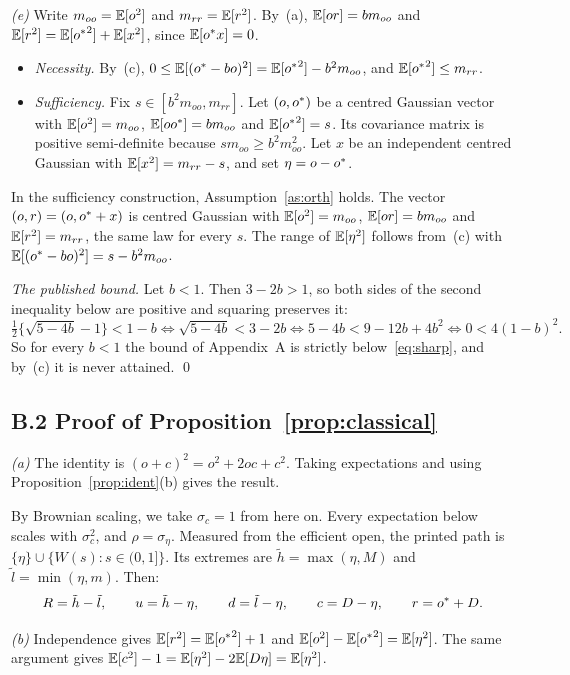 \emph{(e)} Write $m_{oo}=\mathbb{E}[o^2]$ and $m_{rr}=\mathbb{E}[r^2]$. By~(a), $\mathbb{E}[or]=bm_{oo}$ and
$\mathbb{E}[r^2]=\mathbb{E}[{o^{*}}^2]+\mathbb{E}[x^2]$, since $\mathbb{E}[{o^{*}} x]=0$.
\begin{itemize}
  \item \emph{Necessity.} By~(c), $0\le\mathbb{E}[({o^{*}}-bo)^2]=\mathbb{E}[{o^{*}}^2]-b^2m_{oo}$, and
        $\mathbb{E}[{o^{*}}^2]\le m_{rr}$.
  \item \emph{Sufficiency.} Fix $s\in[b^2m_{oo},m_{rr}]$. Let $(o,{o^{*}})$ be a centred Gaussian
        vector with $\mathbb{E}[o^2]=m_{oo}$, $\mathbb{E}[o{o^{*}}]=bm_{oo}$ and $\mathbb{E}[{o^{*}}^2]=s$. Its covariance matrix
        is positive semi-definite because $sm_{oo}\ge b^2m_{oo}^2$. Let $x$ be an independent
        centred Gaussian with $\mathbb{E}[x^2]=m_{rr}-s$, and set $\eta=o-{o^{*}}$.
\end{itemize}
In the sufficiency construction, Assumption~\ref{as:orth} holds. The vector $(o,r)=(o,{o^{*}}+x)$ is
centred Gaussian with $\mathbb{E}[o^2]=m_{oo}$, $\mathbb{E}[or]=bm_{oo}$ and $\mathbb{E}[r^2]=m_{rr}$, the same law for
every $s$. The range of $\mathbb{E}[\eta^2]$ follows from~(c) with
$\mathbb{E}[({o^{*}}-bo)^2]=s-b^2m_{oo}$.

\emph{The published bound.} Let $b<1$. Then $3-2b>1$, so both sides of the second inequality
below are positive and squaring preserves it:
\[
  \tfrac12\{\sqrt{5-4b}-1\}<1-b
  \iff \sqrt{5-4b}<3-2b
  \iff 5-4b<9-12b+4b^2
  \iff 0<4(1-b)^2.
\]
So for every $b<1$ the bound of Appendix~A is strictly below~\eqref{eq:sharp}, and by~(c) it is
never attained. \qed

\subsection*{B.2 Proof of Proposition~\ref{prop:classical}}

\emph{(a)} The identity is $(o+c)^2=o^2+2oc+c^2$. Taking expectations and using
Proposition~\ref{prop:ident}(b) gives the result.

By Brownian scaling, we take $\sigma_c=1$ from here on. Every expectation below scales with
$\sigma_c^2$, and $\rho=\sigma_\eta$. Measured from the efficient open, the printed path is
$\{\eta\}\cup\{W(s):s\in(0,1]\}$. Its extremes are $\tilde h=\max(\eta,M)$ and
$\tilde l=\min(\eta,m)$. Then:
\[
  R=\tilde h-\tilde l,\qquad u=\tilde h-\eta,\qquad d=\tilde l-\eta,\qquad c=D-\eta,\qquad r={o^{*}}+D.
\]

\emph{(b)} Independence gives $\mathbb{E}[r^2]=\mathbb{E}[{o^{*}}^2]+1$ and $\mathbb{E}[o^2]-\mathbb{E}[{o^{*}}^2]=\mathbb{E}[\eta^2]$. The same
argument gives $\mathbb{E}[c^2]-1=\mathbb{E}[\eta^2]-2\mathbb{E}[D\eta]=\mathbb{E}[\eta^2]$.

